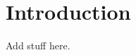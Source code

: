 \documentclass[../thesis.tex]{subfiles}
\begin{document}
\chapter*{Introduction}

Add stuff here\cite{tajima_laser_1979}.

\end{document}
